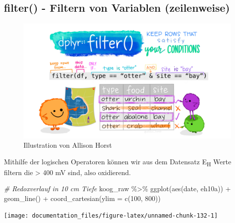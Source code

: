 \documentclass[
]{article}
\newenvironment{Shaded}{\begin{snugshade}}{\end{snugshade}}
\newcommand{\AttributeTok}[1]{\textcolor[rgb]{0.77,0.63,0.00}{#1}}
\newcommand{\CommentTok}[1]{\textcolor[rgb]{0.56,0.35,0.01}{\textit{#1}}}
\newcommand{\DecValTok}[1]{\textcolor[rgb]{0.00,0.00,0.81}{#1}}
\newcommand{\FunctionTok}[1]{\textcolor[rgb]{0.00,0.00,0.00}{#1}}
\newcommand{\NormalTok}[1]{#1}
\newcommand{\SpecialCharTok}[1]{\textcolor[rgb]{0.00,0.00,0.00}{#1}}
\begin{document}
\hypertarget{filter---filtern-von-variablen-zeilenweise}{%
\subsection{filter() - Filtern von Variablen (zeilenweise)}\label{filter---filtern-von-variablen-zeilenweise}}

\begin{figure}

{\centering \includegraphics[width=1\linewidth]{images/033} 

}

\caption{Illustration von Allison Horst}\label{fig:unnamed-chunk-131}
\end{figure}

Mithilfe der logischen Operatoren können wir aus dem Datensatz E\textsubscript{H} Werte filtern die \textgreater{} 400 mV sind, also oxidierend.

\begin{Shaded}
\begin{Highlighting}[]
\CommentTok{\# Redoxverlauf in 10 cm Tiefe}
\NormalTok{koog\_raw }\SpecialCharTok{\%\textgreater{}\%}
  \FunctionTok{ggplot}\NormalTok{(}\FunctionTok{aes}\NormalTok{(date, eh10a)) }\SpecialCharTok{+}
  \FunctionTok{geom\_line}\NormalTok{() }\SpecialCharTok{+}
  \FunctionTok{coord\_cartesian}\NormalTok{(}\AttributeTok{ylim =} \FunctionTok{c}\NormalTok{(}\DecValTok{100}\NormalTok{, }\DecValTok{800}\NormalTok{))}
\end{Highlighting}
\end{Shaded}

\begin{center}\texttt{[image: documentation\_files/figure-latex/unnamed-chunk-132-1]} \end{center}
\end{document}
